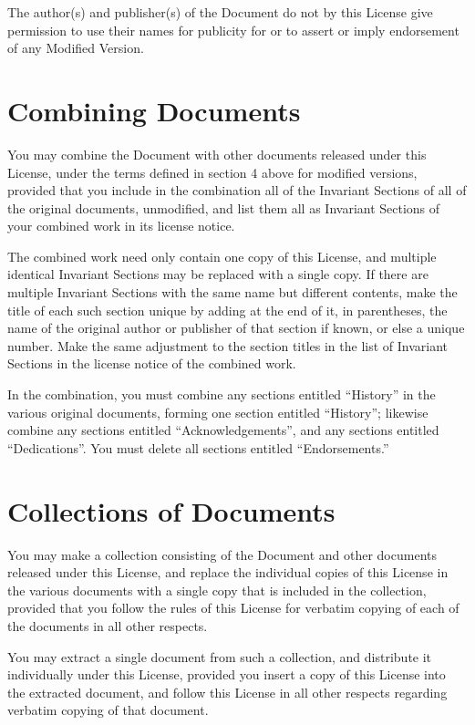 \documentclass[a4paper,11pt,twoside,dvips]{report}
\begin{document}
The author(s) and publisher(s) of the Document do not by this License
give permission to use their names for publicity for or to assert or
imply endorsement of any Modified Version.


\section{Combining Documents}

You may combine the Document with other documents released under this
License, under the terms defined in section 4 above for modified
versions, provided that you include in the combination all of the
Invariant Sections of all of the original documents, unmodified, and
list them all as Invariant Sections of your combined work in its
license notice.

The combined work need only contain one copy of this License, and
multiple identical Invariant Sections may be replaced with a single
copy.  If there are multiple Invariant Sections with the same name but
different contents, make the title of each such section unique by
adding at the end of it, in parentheses, the name of the original
author or publisher of that section if known, or else a unique number.
Make the same adjustment to the section titles in the list of
Invariant Sections in the license notice of the combined work.

In the combination, you must combine any sections entitled ``History''
in the various original documents, forming one section entitled
``History''; likewise combine any sections entitled ``Acknowledgements'',
and any sections entitled ``Dedications''.  You must delete all sections
entitled ``Endorsements.''


\section{Collections of Documents}

You may make a collection consisting of the Document and other documents
released under this License, and replace the individual copies of this
License in the various documents with a single copy that is included in
the collection, provided that you follow the rules of this License for
verbatim copying of each of the documents in all other respects.

You may extract a single document from such a collection, and distribute
it individually under this License, provided you insert a copy of this
License into the extracted document, and follow this License in all
other respects regarding verbatim copying of that document.
\end{document}
